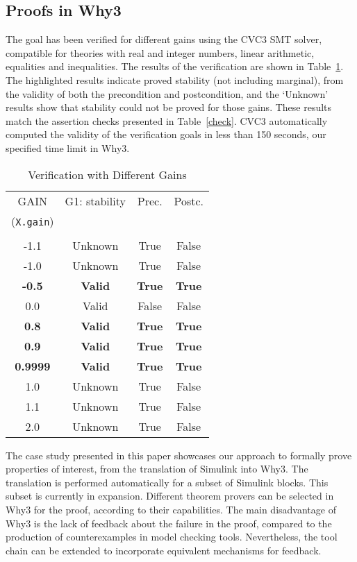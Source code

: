 \documentclass[a4paper]{article}
\begin{document}
\subsection{Proofs in Why3}
The goal has been verified for different gains using the CVC3 SMT solver, compatible for theories with real and integer numbers, linear arithmetic, equalities and inequalities. The results of the verification are shown in Table~\ref{setp}. The highlighted results indicate proved stability (not including marginal), from the validity of both the precondition and postcondition, and the `Unknown' results show that stability could not be proved for those gains. These results match the assertion checks presented in Table~\ref{check}. CVC3 automatically computed the validity of the verification goals in less than 150 seconds, our specified time limit in Why3. 

\begin{table}[!t]
\renewcommand{\arraystretch}{1.3}
\caption{Verification with Different Gains}
\label{setp}
\centering
\begin{tabular}{|c|c|c|c|}
\hline
GAIN&G1: stability&Prec.&Postc.\\ 
(\verb+X.gain+\normalsize )&&&\\
&&& \\ \hline \hline
-1.1&Unknown&True&False \\ \hline
-1.0&Unknown&True&False \\ \hline
\textbf{-0.5}&\textbf{Valid}&\textbf{True}&\textbf{True} \\ \hline
0.0&Valid&False&False\\ \hline
\textbf{0.8}&\textbf{Valid}&\textbf{True}&\textbf{True}\\ \hline
\textbf{0.9}&\textbf{Valid}&\textbf{True}&\textbf{True}\\ \hline
\textbf{0.9999}&\textbf{Valid}&\textbf{True}&\textbf{True}\\ \hline 
1.0&Unknown&True&False \\ \hline
1.1&Unknown&True&False \\ \hline
2.0&Unknown&True&False \\ \hline
\end{tabular}
\end{table}


The case study presented in this paper showcases our approach to formally prove properties of interest, from the translation of Simulink into Why3. The translation is performed automatically for a subset of Simulink blocks. This subset is currently in expansion. Different theorem provers can be selected in Why3 for the proof, according to their capabilities. The main disadvantage of Why3 is the lack of feedback about the failure in the proof, compared to the production of counterexamples in model checking tools. Nevertheless, the tool chain can be extended to incorporate equivalent mechanisms for feedback.
\end{document}
